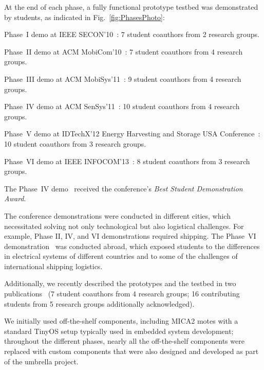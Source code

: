 \documentclass[journal,twopages]{IEEEtran}
\newcommand{\makered}[1]{\color{black}#1\color{black}}
\newenvironment{myitemize}{\begin{list}{}{\renewcommand{\leftmargin}{0.2in}}}{\end{list}}
\begin{document}
At the end of each phase, a fully functional prototype testbed was demonstrated by students, as indicated in Fig.~\ref{fig:PhasesPhoto}:
\begin{myitemize}
\item Phase~I demo at IEEE SECON'10~\cite{SeconDemoEnHANTs2010}: 7 student coauthors from 2 research groups.
\item Phase~II demo at ACM MobiCom'10~\cite{MobiComDemo}: 7 student coauthors from 4 research groups.
\item Phase~III demo at ACM MobiSys'11~\cite{MobiSys2011Demo}: 9 student coauthors from 4 research groups.
\item Phase~IV demo at ACM SenSys'11~\cite{SenSys2011Demo}: 10 student coauthors from 4 research groups.
\item Phase~V demo at IDTechX'12 Energy Harvesting and Storage USA Conference~\cite{IDTechDemo2012}: 10 student coauthors from 3 research groups.
\item Phase~VI demo at IEEE INFOCOM'13~\cite{Margolies2013Demo}: 8 student coauthors from 3 research groups.
\end{myitemize} The Phase~IV demo~\cite{SenSys2011Demo} received the conference's \emph{Best Student Demonstration Award}.


The conference demonstrations were conducted in different cities, which necessitated solving not only technological but also logistical challenges. For example, Phase II, IV, and VI demonstrations required shipping. The Phase~VI demonstration~\cite{Margolies2013Demo} was conducted abroad, which exposed students to the differences in electrical systems of different countries and to some of the challenges of international shipping logistics.

\makered{Additionally, we recently described the prototypes and the testbed in two publications~\cite{Gorlatova2013Prototyping,Gorlatova_EnHANTS_TOSN} (7 student coauthors from 4 research groups;
16 contributing students from 5 research groups additionally acknowledged).}


















\iffalse
We initially used off-the-shelf components, including MICA2 motes with a standard TinyOS setup typically used in embedded system development; throughout the different phases, nearly all the off-the-shelf components were replaced with custom components that were also designed and developed as part of the umbrella project.
\end{document}
